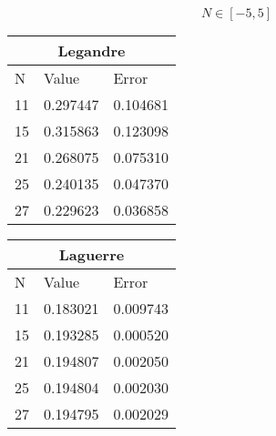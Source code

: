 \documentclass[../main.tex]{subfiles}
\begin{document}
$$N \in [-5,5]$$

\begin{tabular}{ |p{1cm}|p{3cm}|p{3cm}|}
 \hline
 \multicolumn{4}{|c}{Legandre} \\
 \hline
       N   & Value & Error\\
 \hline
 11 & 0.297447 & 0.104681\\
 15 & 0.315863 & 0.123098\\
 21 & 0.268075 & 0.075310\\
 25 & 0.240135 & 0.047370\\
 27 & 0.229623 & 0.036858\\
 \hline
\end{tabular}


\begin{tabular}{ |p{1cm}|p{3cm}|p{3cm}|}
 \hline
 \multicolumn{4}{|c}{Laguerre} \\
 \hline
       N   & Value & Error\\
 \hline
 11 &  0.183021 &  0.009743\\
 15 &  0.193285 &  0.000520\\
 21 &  0.194807 &  0.002050\\
 25 &  0.194804 &  0.002030\\
 27 &  0.194795 &  0.002029\\

 \hline
\end{tabular}
\end{document}
